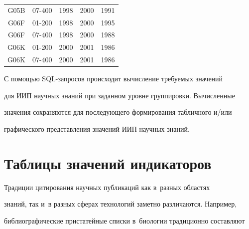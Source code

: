 \begin{table}
\begin{center}
\begin{tabular}{|c|c|c|c|c|}
G05B&07-400&1998&2000&1991\\


G06F&01-200&1998&2000&1995\\


G06F&07-400&1998&2000&1988\\


G06K&01-200&2000&2001&1986\\


G06K&07-400&2000&2001&1986\\


\hline


\end{tabular}


\end{center}


\vspace*{-12pt}


\end{table}


     


     С помощью SQL-запросов происходит вычисление требуемых значений 


для ИИП научных знаний при заданном уровне группировки. Вычисленные 


значения сохраняются для последующего формирования табличного и\!/\!или 


графического представления значений ИИП научных знаний.





\vspace*{-4pt}





\section{Таблицы значений индикаторов}





\vspace*{-2pt}


     


     Традиции цитирования научных публикаций как в~разных областях 


знаний, так и~в разных сферах технологий заметно различаются. Например, 


библиографические пристатейные списки в~биологии традиционно составляют 


